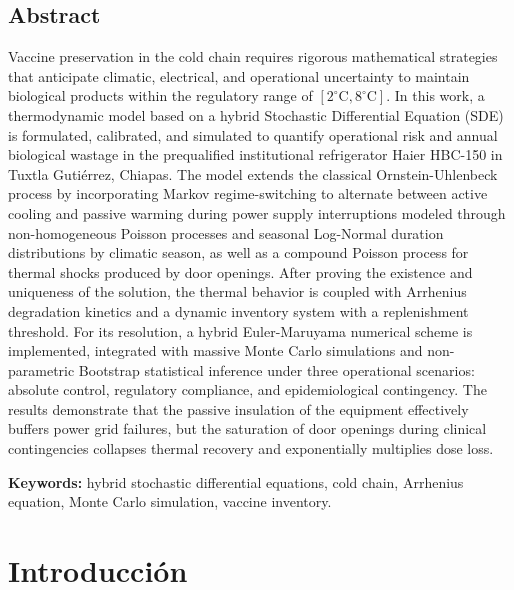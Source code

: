 \documentclass[
  spanish,
  us-letterpaper,
]{scrreprt}
\numberwithin{equation}{section}
\theoremstyle{plain}
\theoremstyle{plain}
\theoremstyle{plain}
\theoremstyle{definition}
\theoremstyle{remark}
\begin{document}
\section{Abstract}\label{abstract}

Vaccine preservation in the cold chain requires rigorous mathematical
strategies that anticipate climatic, electrical, and operational
uncertainty to maintain biological products within the regulatory range
of \([2^\circ\text{C}, 8^\circ\text{C}]\). In this work, a thermodynamic
model based on a hybrid Stochastic Differential Equation (SDE) is
formulated, calibrated, and simulated to quantify operational risk and
annual biological wastage in the prequalified institutional refrigerator
Haier HBC-150 in Tuxtla Gutiérrez, Chiapas. The model extends the
classical Ornstein-Uhlenbeck process by incorporating Markov
regime-switching to alternate between active cooling and passive warming
during power supply interruptions modeled through non-homogeneous
Poisson processes and seasonal Log-Normal duration distributions by
climatic season, as well as a compound Poisson process for thermal
shocks produced by door openings. After proving the existence and
uniqueness of the solution, the thermal behavior is coupled with
Arrhenius degradation kinetics and a dynamic inventory system with a
replenishment threshold. For its resolution, a hybrid Euler-Maruyama
numerical scheme is implemented, integrated with massive Monte Carlo
simulations and non-parametric Bootstrap statistical inference under
three operational scenarios: absolute control, regulatory compliance,
and epidemiological contingency. The results demonstrate that the
passive insulation of the equipment effectively buffers power grid
failures, but the saturation of door openings during clinical
contingencies collapses thermal recovery and exponentially multiplies
dose loss.

\textbf{Keywords:} hybrid stochastic differential equations, cold chain,
Arrhenius equation, Monte Carlo simulation, vaccine inventory.


\chapter{Introducción}\label{introducciuxf3n}
\end{document}
